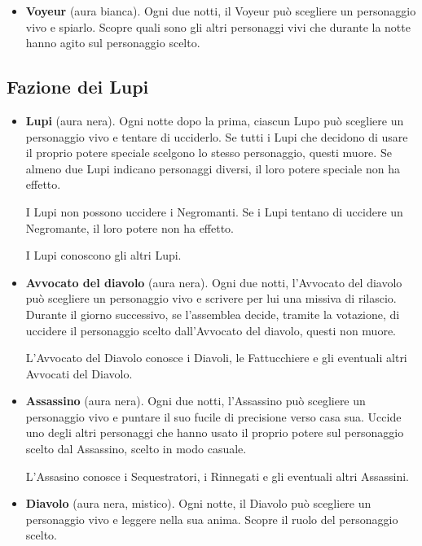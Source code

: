 \documentclass[a4paper,10pt]{article}
\begin{document}
\begin{itemize}
 \item {\bf Voyeur} (aura bianca). Ogni due notti, il Voyeur può scegliere un personaggio vivo e spiarlo. Scopre quali sono gli altri personaggi vivi che durante la notte hanno agito sul personaggio scelto.
 

\end{itemize}


\subsection*{Fazione dei Lupi}

\begin{itemize}
 \item {\bf Lupi} (aura nera). Ogni notte dopo la prima, ciascun Lupo può scegliere un personaggio vivo e tentare di ucciderlo. Se tutti i Lupi che decidono di usare il proprio potere speciale scelgono lo stesso personaggio, questi muore. Se almeno due Lupi indicano personaggi diversi, il loro potere speciale non ha effetto.
 
 I Lupi non possono uccidere i Negromanti. Se i Lupi tentano di uccidere un Negromante, il loro potere non ha effetto.
 
 I Lupi conoscono gli altri Lupi.

 \item {\bf Avvocato del diavolo} (aura nera). Ogni due notti, l'Avvocato del diavolo può scegliere un personaggio vivo e scrivere per lui una missiva di
rilascio. Durante il giorno successivo, se l'assemblea decide, tramite la votazione, di uccidere il personaggio scelto dall'Avvocato del diavolo, questi non muore.
 
 L'Avvocato del Diavolo conosce i Diavoli, le Fattucchiere e gli eventuali altri Avvocati del Diavolo.
 
 \item {\bf Assassino} (aura nera). Ogni due notti, l'Assassino può scegliere un personaggio vivo e puntare il suo fucile di precisione verso casa sua. Uccide uno degli altri personaggi che hanno usato il proprio potere sul personaggio scelto dal Assassino, scelto in modo casuale.
 
 L'Assasino conosce i Sequestratori, i Rinnegati e gli eventuali altri Assassini.

 \item {\bf Diavolo} (aura nera, mistico). Ogni notte, il Diavolo può scegliere un personaggio vivo e leggere nella sua anima. Scopre il ruolo del personaggio
scelto.
 

\end{itemize}
\end{document}
